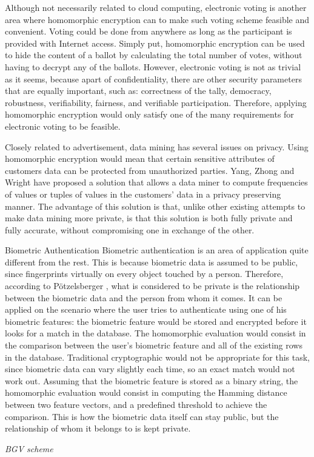 \begin{description}
\item[Electronic Voting] Although not necessarily related to cloud computing, electronic voting is another area where homomorphic encryption can to make such voting scheme feasible and convenient. Voting could be done from anywhere as long as the participant is provided with Internet access. Simply put, homomorphic encryption can be used to hide the content of a ballot by calculating the total number of votes, without having to decrypt any of the ballots. However, electronic voting is not as trivial as it seems, because apart of confidentiality, there are other security parameters that are equally important, such as: correctness of the tally, democracy, robustness, verifiability, fairness, and verifiable participation. Therefore, applying homomorphic encryption would only satisfy one of the many requirements for electronic voting to be feasible.
\item[Data mining] Closely related to advertisement, data mining has several issues on privacy. Using homomorphic encryption would mean that certain sensitive attributes of customers data can be protected from unauthorized parties. Yang, Zhong and Wright \cite{YangZhongWright} have proposed a solution that allows a data miner to compute frequencies of values or tuples of values in the customers' data in a privacy preserving manner. The advantage of this solution is that, unlike other existing attempts to make data mining more private, is that this solution is both fully private and fully accurate, without compromising one in exchange of the other.
\item{Biometric Authentication} Biometric authentication is an area of application quite different from the rest. This is because biometric data is assumed to be public, since fingerprints virtually on every object touched by a person. Therefore, according to P{\"o}tzelsberger \cite{potzelsberger2013kv}, what is considered to be private is the relationship between the biometric data and the person from whom it comes. It can be applied on the scenario where the user tries to authenticate using one of his biometric features: the biometric feature would be stored and encrypted before it looks for a match in the database. The homomorphic evaluation would consist in the comparison between the user's biometric feature and all of the existing rows in the database. Traditional cryptographic would not be appropriate for this task, since biometric data can vary slightly each time, so an exact match would not work out. Assuming that the biometric feature is stored as a binary string, the homomorphic evaluation would consist in computing the Hamming distance between two feature vectors, and a predefined threshold to achieve the comparison. This is how the biometric data itself can stay public, but the relationship of whom it belongs to is kept private.
\end{description}

\textit{BGV scheme}



\clearpage
